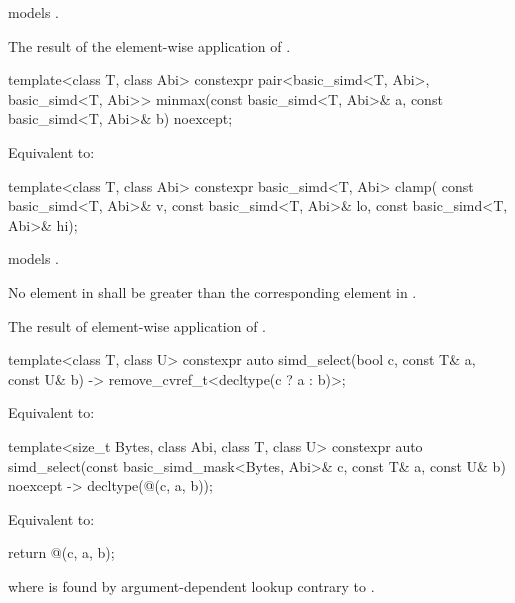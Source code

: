 \begin{itemdescr}
  \pnum\constraints
   models .

  \pnum\returns
  The result of the element-wise application of  \foralli.
\end{itemdescr}

\begin{itemdecl}
template<class T, class Abi>
  constexpr pair<basic_simd<T, Abi>, basic_simd<T, Abi>>
  minmax(const basic_simd<T, Abi>& a, const basic_simd<T, Abi>& b) noexcept;
\end{itemdecl}

\begin{itemdescr}
  \pnum\effects
  Equivalent to: 
\end{itemdescr}

\begin{itemdecl}
template<class T, class Abi>
  constexpr basic_simd<T, Abi> clamp(
    const basic_simd<T, Abi>& v, const basic_simd<T, Abi>& lo, const basic_simd<T, Abi>& hi);
\end{itemdecl}

\begin{itemdescr}
  \pnum\constraints
   models .

  \pnum\expects
  No element in  shall be greater than the corresponding element in .

  \pnum\returns
  The result of element-wise application of  \foralli.
\end{itemdescr}

\begin{itemdecl}
  template<class T, class U>
    constexpr auto simd_select(bool c, const T& a, const U& b)
    -> remove_cvref_t<decltype(c ? a : b)>;
\end{itemdecl}

\begin{itemdescr}
    \pnum\effects
    Equivalent to: 
\end{itemdescr}

\begin{itemdecl}
  template<size_t Bytes, class Abi, class T, class U>
    constexpr auto simd_select(const basic_simd_mask<Bytes, Abi>& c, const T& a, const U& b)
    noexcept -> decltype(@\simdselect@(c, a, b));
\end{itemdecl}

\begin{itemdescr}
  \pnum\effects
  Equivalent to:
  \begin{codeblock}
return @\simdselect@(c, a, b);
  \end{codeblock}
  where \tcode{\simdselect} is found by argument-dependent lookup 
  contrary to .
\end{itemdescr}

